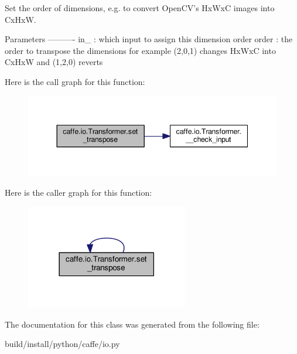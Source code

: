 \begin{DoxyVerb}Set the order of dimensions, e.g. to convert OpenCV's HxWxC images
into CxHxW.

Parameters
----------
in_ : which input to assign this dimension order
order : the order to transpose the dimensions
    for example (2,0,1) changes HxWxC into CxHxW and (1,2,0) reverts
\end{DoxyVerb}
 Here is the call graph for this function\+:
\nopagebreak
\begin{figure}[H]
\begin{center}
\leavevmode
\includegraphics[width=344pt]{classcaffe_1_1io_1_1_transformer_af0acba3b0fe23e7fe33228600b18279a_cgraph}
\end{center}
\end{figure}
Here is the caller graph for this function\+:
\nopagebreak
\begin{figure}[H]
\begin{center}
\leavevmode
\includegraphics[width=201pt]{classcaffe_1_1io_1_1_transformer_af0acba3b0fe23e7fe33228600b18279a_icgraph}
\end{center}
\end{figure}


The documentation for this class was generated from the following file\+:\begin{DoxyCompactItemize}
\item 
build/install/python/caffe/io.\+py\end{DoxyCompactItemize}
